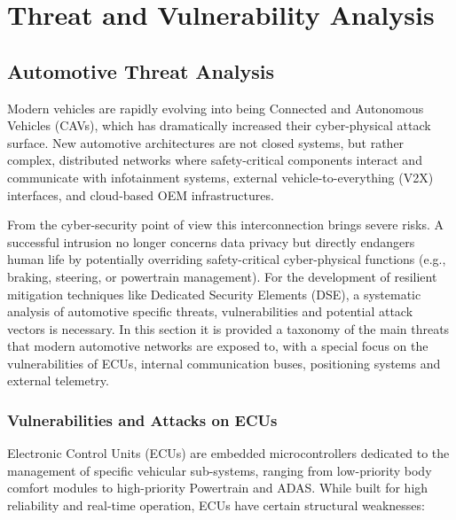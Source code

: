\chapter{Threat and Vulnerability Analysis}\label{ch:Threat_analysis}

\section{Automotive Threat Analysis}\label{sec:automotive_threat_analysis}

Modern vehicles are rapidly evolving into being Connected and Autonomous Vehicles (CAVs), which has dramatically increased their cyber-physical attack surface. New automotive architectures are not closed systems, but rather complex, distributed networks where safety-critical components interact and communicate with infotainment systems, external vehicle-to-everything (\gls{V2X}) interfaces, and cloud-based \gls{OEM} infrastructures.

From the cyber-security point of view this interconnection brings severe risks.
A successful intrusion no longer concerns data privacy but directly endangers human life by potentially overriding safety-critical cyber-physical functions (e.g., braking, steering, or powertrain management). For the development of resilient mitigation techniques like Dedicated Security Elements (DSE), a systematic analysis of automotive specific threats, vulnerabilities and potential attack vectors is necessary.
In this section it is provided a taxonomy of the main threats that modern automotive networks are exposed to, with a special focus on the vulnerabilities of \glspl{ECU}, internal communication buses, positioning systems and external telemetry.

\subsection{Vulnerabilities and Attacks on ECUs}
Electronic Control Units (\glspl{ECU}) are embedded microcontrollers dedicated to the management of specific vehicular sub-systems, ranging from low-priority body comfort modules to high-priority Powertrain and \gls{ADAS}. While built for high reliability and real-time operation, \glspl{ECU} have certain structural weaknesses:

